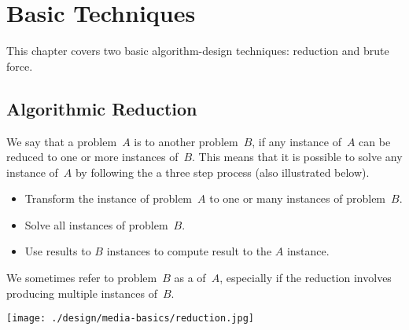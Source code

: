 \chapter{Basic Techniques}
\label{ch:design::basics}

\begin{preamble}
This chapter covers two basic algorithm-design techniques: reduction and brute force.
\end{preamble}

\section{Algorithmic Reduction}
\label{sec:design::reduction}

\begin{definition}
\label{def:design::reduction}
We say that a problem~$A$ is  to another problem~$B$,
if any instance of~$A$ can be reduced to one or more instances of~$B$.
%
This means that it is possible to solve any instance of~$A$ by
following the a three step process (also illustrated below).
%
\begin{itemize}
\item Transform the instance of problem~$A$ to one or many instances of problem~$B$.
\item Solve all instances of problem~$B$.
\item Use results to $B$ instances to compute result to
 the $A$ instance.
\end{itemize}
%
We sometimes refer to problem~$B$ as a  of~$A$,
especially if the reduction involves producing multiple instances
of~$B$.
%

\begin{center}
\texttt{[image: ./design/media-basics/reduction.jpg]}
\end{center}

\end{definition}



